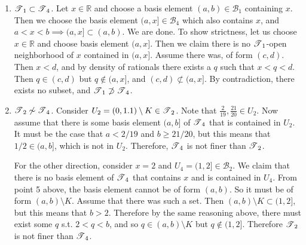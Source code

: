 \begin{solution}[Munkres 13.7]
\begin{enumerate}
      \item $\operatorname{\mathscr{T}}_1 \subset \operatorname{\mathscr{T}}_4$. Let $x \in \mathbb{R}$ and choose a basis element $(a, b) \in \mathscr{B}_1$ containing $x$. Then we choose the basis element $(a, x] \in \mathscr{B}_4$ which also contains $x$, and $a < x < b \implies (a, x] \subset (a, b)$. We are done. To show strictness, let us choose $x \in \mathbb{R}$ and choose basis element $(a, x]$. Then we claim there is no $\operatorname{\mathscr{T}}_1$-open neighborhood of $x$ contained in $(a, x]$. Assume there was, of form $(c, d)$. Then $x < d$, and by density of rationals there exists a $q$ such that $x < q < d$. Then $q \in (c, d)$ but $q \not\in (a, x]$, and $(c, d) \not\subset (a, x]$. By contradiction, there exists no subset, and $\operatorname{\mathscr{T}}_1 \not\supset \operatorname{\mathscr{T}}_4$. 

      \item $\operatorname{\mathscr{T}}_2 \not\sim \operatorname{\mathscr{T}}_4$. Consider $U_2 = (0, 1.1) \setminus K \in \operatorname{\mathscr{T}}_2$. Note that $\frac{2}{19}, \frac{21}{20} \in U_2$. Now assume that there is some basis element $(a, b]$ of $\operatorname{\mathscr{T}}_4$ that is contained in $U_2$. It must be the case that $a < 2/19$ and $b \geq 21/20$, but this means that $1/2 \in (a, b]$, which is not in $U_2$. Therefore, $\operatorname{\mathscr{T}}_4$ is not finer than $\operatorname{\mathscr{T}}_2$. 

      For the other direction, consider $x = 2$ and $U_4 = (1, 2] \in \mathscr{B}_2$. We claim that there is no basis element of $\operatorname{\mathscr{T}}_4$ that contains $x$ and is contained in $U_4$. From point 5 above, the basis element cannot be of form $(a, b)$. So it must be of form $(a, b) \setminus K$. Assume that there was such a set. Then $(a, b) \setminus K \subset (1, 2]$, but this means that $b > 2$. Therefore by the same reasoning above, there must exist some $q$ s.t. $2 < q < b$, and so $q \in (a, b) \setminus K$ but $q \not\in (1, 2]$. Therefore $\operatorname{\mathscr{T}}_2$ is not finer than $\operatorname{\mathscr{T}}_4$. 
    \end{enumerate}
  \end{solution}

